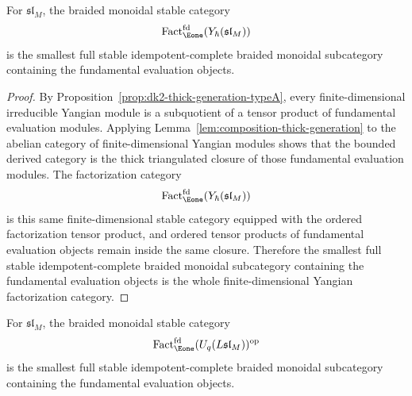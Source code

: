 \begin{lemma}
\label{lem:yangian-fd-fundamental-generation}
For $\mathfrak{sl}_M$, the braided monoidal stable category
\[
\operatorname{Fact}_{\Eone}^{\mathrm{fd}}(Y_\hbar(\mathfrak{sl}_M))
\]
is the smallest full stable idempotent-complete braided monoidal
subcategory containing the fundamental evaluation objects.
\end{lemma}

\begin{proof}
By Proposition~\ref{prop:dk2-thick-generation-typeA}, every
finite-dimensional irreducible Yangian module is a subquotient of a
tensor product of fundamental evaluation modules. Applying
Lemma~\ref{lem:composition-thick-generation} to the abelian category of
finite-dimensional Yangian modules shows that the bounded derived
category is the thick triangulated closure of those fundamental
evaluation modules. The factorization category
\[
\operatorname{Fact}_{\Eone}^{\mathrm{fd}}(Y_\hbar(\mathfrak{sl}_M))
\]
is this same finite-dimensional stable category equipped with the
ordered factorization tensor product, and ordered tensor products of
fundamental evaluation objects remain inside the same closure.
Therefore the smallest full stable idempotent-complete braided
monoidal subcategory containing the fundamental evaluation objects is
the whole finite-dimensional Yangian factorization category.
\end{proof}

\begin{lemma}
\label{lem:quantum-fd-fundamental-generation}
For $\mathfrak{sl}_M$, the braided monoidal stable category
\[
\operatorname{Fact}_{\Eone}^{\mathrm{fd}}(U_q(L\mathfrak{sl}_M))^{\mathrm{op}}
\]
is the smallest full stable idempotent-complete braided monoidal
subcategory containing the fundamental evaluation objects.
\end{lemma}

